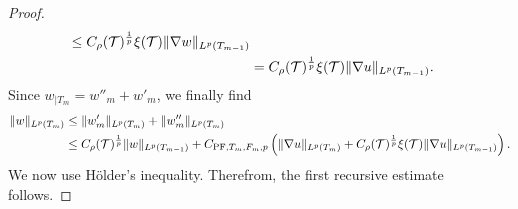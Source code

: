 \documentclass[10pt,letterpaper]{article}
\begin{document}
\begin{proof}
\begin{align*}
        \leq 
        C_\rho({\mathcal T})^{\frac 1 p} \xi({\mathcal T})
        \| \nabla w \|_{L^{p}(T_{m-1})}
        \\&
        =
        C_\rho({\mathcal T})^{\frac 1 p} \xi({\mathcal T})
        \| \nabla u \|_{L^{p}(T_{m-1})}
        .
    \end{align*}
    Since $w_{|T_{m}} = w''_{m} + w'_{m}$, we finally find 
    \begin{align*}
        \| w \|_{L^{p}(T_{m})}
        &
        \leq  
        \| w'_{m} \|_{L^{p}(T_{m})}
        + 
        \| w''_{m} \|_{L^{p}(T_{m})}
        \\&
        \leq  
        C_\rho({\mathcal T})^{\frac 1 p} 
        \| w \|_{L^{p}(T_{m-1})} 
        + 
        C_{{\rm PF},T_{m},F_{m},p} 
        \left( 
            \| \nabla u \|_{L^{p}(T_{m})} 
            + 
            C_\rho({\mathcal T})^{\frac 1 p} \xi({\mathcal T})
        \| \nabla u \|_{L^{p}(T_{m-1})}
        \right). 
    \end{align*}
    We now use H\"older's inequality. 
    Therefrom, the first recursive estimate follows.
    

\end{proof}
\end{document}
